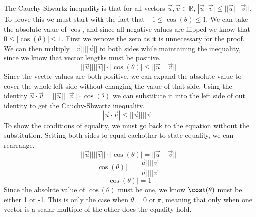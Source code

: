 \documentclass{article}
\begin{document}
The Cauchy Shwartz inequality is that for all vectors $\vec{u},\vec{v}\in\mathbb{R}$,  $|\vec{u}\cdot\vec{v}|\leq||\vec{u}||||\vec{v}||$. To prove this we must start with the fact that $-1\leq\cos(\theta)\leq1$. We can take the absolute value of $\cos$, and since all negative values are flipped we know that $0\leq|\cos(\theta)|\leq1$. First we remove the zero as it is unnecessary for the proof. We can then multiply $||\vec{v}||||\vec{u}||$ to both sides while maintaining the inequality, since we know that vector lengths must be positive.
\[||\vec{u}||||\vec{v}||\cdot|\cos(\theta)| \leq ||\vec{u}||||\vec{v}||\]
Since the vector values are both positive, we can expand the absolute value to cover the whole left side without changing the value of that side. Using the identity $\vec{u}\cdot\vec{v}=||\vec{u}||||\vec{v}||\cdot\cos(\theta)$ we can substitute it into the left side of out identity to get the Cauchy-Shwartz inequality.
\[|\vec{u}\cdot\vec{v}| \leq ||\vec{u}||||\vec{v}||\]
To show the conditions of equality, we must go back to the equation without the substitution. Setting both sides to equal eachother to state equality, we can rearrange.
\[||\vec{u}||||\vec{v}||\cdot|\cos(\theta)| = ||\vec{u}||||\vec{v}||\]
\[|\cos(\theta)| = \frac{||\vec{u}||||\vec{v}||}{||\vec{u}||||\vec{v}||}\]
\[|\cos(\theta)| = 1\]
Since the absolute value of $\cos(\theta)$ must be one, we know $\cost(\theta)$ must be either 1 or -1. This is only the case when $\theta = 0$ or $\pi$, meaning that only when one vector is a scalar multiple of the other does the equality hold.
\end{document}
